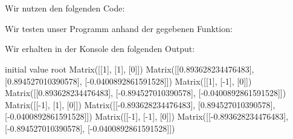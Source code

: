 \section{}

Wir nutzen den folgenden Code: 



Wir testen unser Programm anhand der gegebenen Funktion:



Wir erhalten in der Konsole den folgenden Output:

\begin{consoleoutput}
initial value                   root
Matrix([[1], [1], [0]])         Matrix([[0.893628234476483], [0.894527010390578], [-0.0400892861591528]])
Matrix([[1], [-1], [0]])        Matrix([[0.893628234476483], [-0.894527010390578], [-0.0400892861591528]])
Matrix([[-1], [1], [0]])        Matrix([[-0.893628234476483], [0.894527010390578], [-0.0400892861591528]])
Matrix([[-1], [-1], [0]])       Matrix([[-0.893628234476483], [-0.894527010390578], [-0.0400892861591528]])
\end{consoleoutput}
